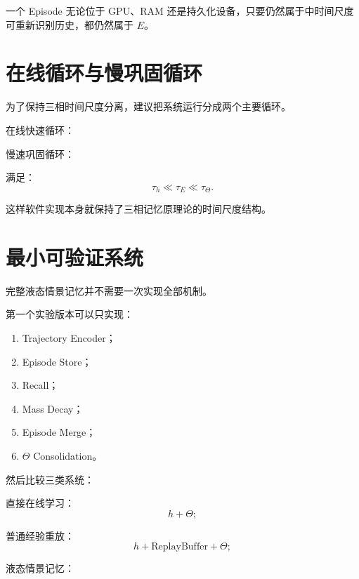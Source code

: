一个 Episode 无论位于 GPU、RAM 还是持久化设备，只要仍然属于中时间尺度可重新识别历史，都仍然属于 $E$。

\section{在线循环与慢巩固循环}

为了保持三相时间尺度分离，建议把系统运行分成两个主要循环。

在线快速循环：
\begin{statementbox}
\centering
{}
\end{statementbox}

慢速巩固循环：
\begin{statementbox}
\centering
{}
\end{statementbox}

满足：
\[
\tau_h
\ll
\tau_E
\ll
\tau_\Theta.
\]

这样软件实现本身就保持了三相记忆原理论的时间尺度结构。

\section{最小可验证系统}

完整液态情景记忆并不需要一次实现全部机制。

第一个实验版本可以只实现：

\begin{enumerate}
    \item Trajectory Encoder；
    \item Episode Store；
    \item Recall；
    \item Mass Decay；
    \item Episode Merge；
    \item $\Theta$ Consolidation。
\end{enumerate}

然后比较三类系统：

直接在线学习：
\[
h+\Theta;
\]

普通经验重放：
\[
h+\mathrm{ReplayBuffer}+\Theta;
\]

液态情景记忆：
\begin{statementbox}
\centering
{}
\end{statementbox}

